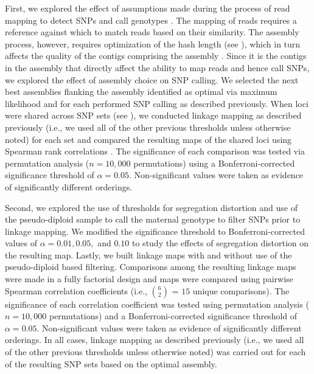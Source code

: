 \documentclass[11pt]{article}
\begin{document}
First, we explored the effect of assumptions made during the process of read mapping to detect SNPs and call genotypes 
\citep[cf.][]{Pool:2010}. The mapping of reads requires a reference against which to match reads based on their similarity. 
The assembly process, however, requires optimization of the hash length (see ), 
which in turn affects the quality of the contigs comprising the assembly \citep{Earl:2011gt,Salzberg:2011fr,Bradnam:2013uu}.  
Since it is the contigs in the assembly that directly affect the ability to map reads and hence call SNPs, we explored the effect 
of assembly choice on SNP calling. We selected the next best assemblies flanking the assembly identified as optimal via maximum likelihood 
and for each performed SNP calling as described previously. When loci were shared across SNP sets (see ), we 
conducted linkage mapping as described previously (i.e., we used all of the other previous thresholds unless otherwise noted) for each 
set and compared the resulting maps of the shared loci using Spearman rank correlations \citep{Spearman:1904}.  
The significance of each comparison was tested via permutation analysis ($n = 10,000$ permutations) using a Bonferroni-corrected significance 
threshold of $\alpha = 0.05$. Non-significant values were taken as evidence of significantly different orderings.

Second, we explored the use of thresholds for segregation distortion and 
use of the pseudo-diploid sample to call the maternal genotype to filter SNPs prior to linkage mapping. 
We modified the significance threshold to Bonferroni-corrected values of $\alpha = 0.01, 0.05,$ 
and $0.10$ to study the effects of segregation distortion on the resulting map. 
Lastly, we built linkage maps with and without use of the pseudo-diploid based filtering. Comparisons among the resulting linkage 
maps were made in a fully factorial design and maps were compared using pairwise Spearman correlation coefficients 
(i.e., {$6 \choose 2$} = $15$ unique comparisons). The significance of each correlation coefficient 
was tested using permutation analysis ($n = 10,000$ permutations) and a Bonferroni-corrected significance threshold of $\alpha = 0.05$. 
Non-significant values were taken as evidence of significantly different orderings. In all cases, linkage mapping as described previously 
(i.e., we used all of the other previous thresholds unless otherwise noted) was carried out for each of the resulting SNP sets based on 
the optimal assembly.
\end{document}

